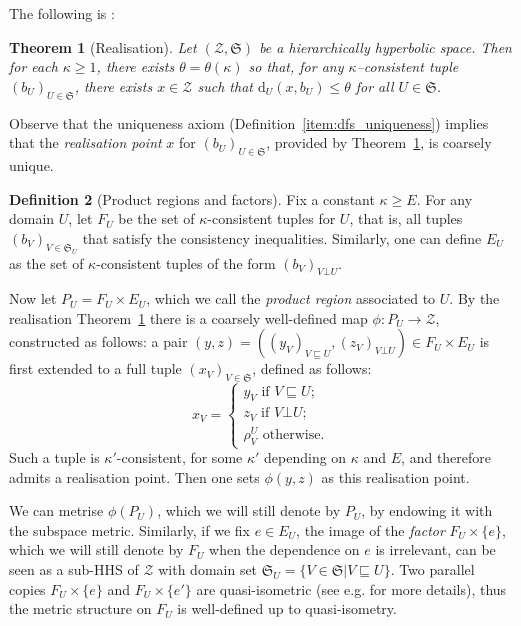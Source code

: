 \documentclass[svgnames]{amsart}
\theoremstyle{plain}
\newtheorem{thm}{Theorem}[section]
\theoremstyle{definition}
\newtheorem{defn}[thm]{Definition}
\newcommand{\frakS}{\mathfrak S}
\newcommand{\dist}{\mathrm{d}}
\newcommand{\nest}{\sqsubseteq}
\newcommand{\orth}{\bot}
\newcommand{\cuco}[1]{{\mathcal #1}}
\begin{document}
The following is \cite[Theorem~3.1]{HHS_II}:

\begin{thm}[Realisation]\label{thm:realisation}
Let $(\cuco Z,\frakS)$ be a hierarchically hyperbolic space. Then for each $\kappa\geq1$, there exists $\theta=\theta(\kappa)$ so that,  for any $\kappa$--consistent tuple $(b_U)_{U\in\frakS}$, there exists $x\in\cuco Z$ such that $\dist_U(x,b_U)\leq\theta$ for all $U\in\frakS$.
\end{thm}

\noindent Observe that the uniqueness axiom (Definition~\eqref{item:dfs_uniqueness}) implies that the \emph{realisation point} $x$ for $(b_U)_{U\in\frakS}$, provided by Theorem~\ref{thm:realisation}, is coarsely unique.  




\begin{defn}[Product regions and factors]\label{defn:factor}
Fix a constant $\kappa\ge E$. For any domain $U$, let $F_U$ be the set of $\kappa$-consistent tuples for $U$, that is, all tuples $(b_V)_{V\in\frakS_U}$ that satisfy the consistency inequalities. Similarly, one can define $E_U$ as the set of $\kappa$-consistent tuples of the form $(b_V)_{V\orth U}$.

Now let $P_U=F_U\times E_U$, which we call the \emph{product region} associated to $U$. By the realisation Theorem~\ref{thm:realisation} there is a coarsely well-defined map $\phi\colon P_U \to \cuco Z$, constructed as follows:
a pair $(y,z)=\left((y_V)_{V\nest U},(z_V)_{V\orth U} \right)\in F_U\times E_U$ is first extended to a full tuple $(x_V)_{V\in\frakS}$, defined as follows:
$$x_V=\begin{cases}
    y_V \mbox{ if }V\nest U;\\
    z_V \mbox{ if }V\orth U;\\
    \rho^U_V \mbox{ otherwise}.
\end{cases}$$
Such a tuple is $\kappa'$-consistent, for some $\kappa'$ depending on $\kappa$ and $E$, and therefore admits a realisation point. Then one sets $\phi(y,z)$ as this realisation point.

We can metrise $\phi(P_U)$, which we will still denote by $P_U$, by endowing it with the subspace metric. Similarly, if we fix $e\in E_U$, the image of the \emph{factor} $F_U\times\{e\}$, which we will still denote by $F_U$ when the dependence on $e$ is irrelevant, can be seen as a sub-HHS of $\cuco Z$ with domain set $\frakS_U=\{V\in\frakS | V\nest U\}$. Two parallel copies $F_U\times\{e\}$ and $F_U\times\{e'\}$ are quasi-isometric (see e.g. \cite[Section 2.2]{DHScorrection} for more details), thus the metric structure on $F_U$ is well-defined up to quasi-isometry. 
\end{defn}
\end{document}
